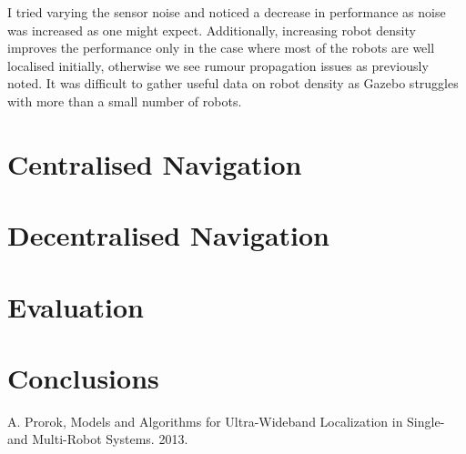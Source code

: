 \documentclass[10pt,a4paper]{article}
\begin{document}
I tried varying the sensor noise and noticed a decrease in performance as noise was increased as one might expect. Additionally, increasing robot density improves the performance only in the case where most of the robots are well localised initially, otherwise we see rumour propagation issues as previously noted. It was difficult to gather useful data on robot density as Gazebo struggles with more than a small number of robots.
\section{Centralised Navigation}
\section{Decentralised Navigation}
\section{Evaluation}
\section{Conclusions}
\begin{thebibliography}{9}
 A. Prorok, Models and Algorithms for Ultra-Wideband Localization in Single- and Multi-Robot Systems. 2013.
\end{thebibliography}
\end{document}
